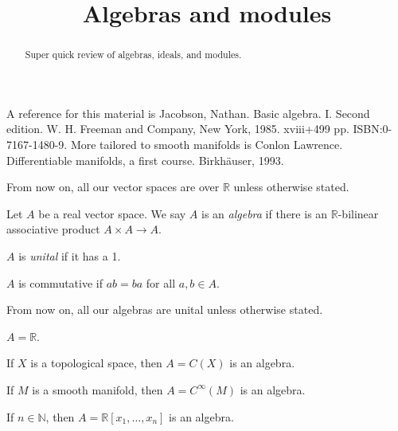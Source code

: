 \documentclass{ximera}
\title{Algebras and modules}
\begin{document}
    \begin{abstract} Super quick review of algebras, ideals, and modules. \end{abstract}
    \maketitle

 A reference for this material is   Jacobson, Nathan.  Basic algebra. I. Second edition. W. H. Freeman and Company, New York, 1985. xviii+499 pp. ISBN:0-7167-1480-9. More tailored to smooth manifolds is Conlon Lawrence. Differentiable manifolds, a first course. Birkh\"auser, 1993.


\begin{notation}
    From now on, all our vector spaces are over $\mathbb{R}$ unless otherwise stated.
\end{notation}

\begin{definition}[Algebras]
    Let $A$ be a real vector space. We say $A$ is an \emph{algebra} if there is an $\mathbb{R}$-bilinear associative product $A \times A \to A$.  
    
    $A$ is \emph{unital} if it has a 1.

    $A$ is commutative if $ab=ba$ for all $a,b \in A$.
\end{definition}


\begin{notation}
    From now on, all our algebras are unital unless otherwise stated.
\end{notation}



\begin{example}
    $A = \mathbb{R}$.
\end{example}

\begin{example}
    If $X$ is a topological space, then $A = C(X)$ is an algebra.
\end{example}

\begin{example}
    If $M$ is a smooth manifold, then $A = C^{\infty}(M)$ is an algebra.
\end{example}


\begin{example}
If $n \in \mathbb{N}$, then $A = \mathbb{R}[x_1, \ldots, x_n] $ is an algebra.
\end{example}
\end{document}
